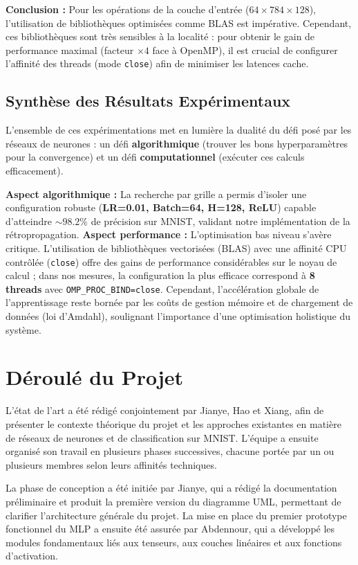 \documentclass[a4paper,11pt]{article}
\begin{document}
\textbf{Conclusion :} Pour les opérations de la couche d'entrée ($64 \times 784 \times 128$), l'utilisation de bibliothèques optimisées comme BLAS est impérative. Cependant, ces bibliothèques sont très sensibles à la localité : pour obtenir le gain de performance maximal (facteur $\times 4$ face à OpenMP), il est crucial de configurer l'affinité des threads (mode \texttt{close}) afin de minimiser les latences cache.

\subsection{Synthèse des Résultats Expérimentaux}
L'ensemble de ces expérimentations met en lumière la dualité du défi posé par les réseaux de neurones : un défi \textbf{algorithmique} (trouver les bons hyperparamètres pour la convergence) et un défi \textbf{computationnel} (exécuter ces calculs efficacement).

\textbf{Aspect algorithmique :} La recherche par grille a permis d'isoler une configuration robuste (\textbf{LR=0.01, Batch=64, H=128, ReLU}) capable d'atteindre $\sim98.2\%$ de précision sur MNIST, validant notre implémentation de la rétropropagation.
\textbf{Aspect performance :} L'optimisation bas niveau s'avère critique. L'utilisation de bibliothèques vectorisées (BLAS) avec une affinité CPU contrôlée (\texttt{close}) offre des gains de performance considérables sur le noyau de calcul ; dans nos mesures, la configuration la plus efficace correspond à \textbf{8 threads} avec \texttt{OMP\_PROC\_BIND=close}. Cependant, l'accélération globale de l'apprentissage reste bornée par les coûts de gestion mémoire et de chargement de données (loi d'Amdahl), soulignant l'importance d'une optimisation holistique du système.

\section{Déroulé du Projet}
L'état de l'art a été rédigé conjointement par Jianye, Hao et Xiang, afin de présenter le contexte théorique du projet et les approches existantes en matière de réseaux de neurones et de classification sur MNIST. L'équipe a ensuite organisé son travail en plusieurs phases successives, chacune portée par un ou plusieurs membres selon leurs affinités techniques.

La phase de conception a été initiée par Jianye, qui a rédigé la documentation préliminaire et produit la première version du diagramme UML, permettant de clarifier l'architecture générale du projet. La mise en place du premier prototype fonctionnel du MLP a ensuite été assurée par Abdennour, qui a développé les modules fondamentaux liés aux tenseurs, aux couches linéaires et aux fonctions d'activation.
\end{document}
